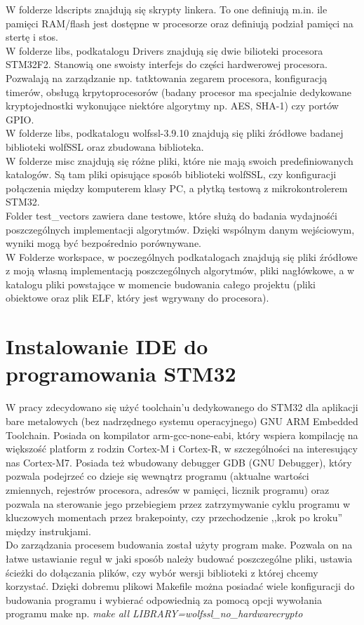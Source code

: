 \documentclass[oneside]{mgr}
\begin{document}
W folderze ldscripts znajdują się skrypty linkera. To one definiują m.in. ile pamięci RAM/flash jest dostępne w procesorze oraz definiują podział pamięci na stertę i stos.\\
W folderze libs, podkatalogu Drivers znajdują się dwie bilioteki procesora STM32F2. Stanowią one swoisty interfejs do części hardwerowej procesora. Pozwalają na zarządzanie np. tatktowania zegarem procesora, konfiguracją timerów, obsługą krpytoprocesorów (badany procesor ma specjalnie dedykowane kryptojednostki wykonujące niektóre algorytmy np. AES, SHA-1) czy portów GPIO.\\
W folderze libs, podkatalogu wolfssl-3.9.10 znajdują się pliki źródłowe badanej biblioteki wolfSSL oraz zbudowana biblioteka.\\
W folderze misc znajdują się różne pliki, które nie mają swoich predefiniowanych katalogów. Są tam pliki opisujące sposób biblioteki wolfSSL, czy konfiguracji połączenia między komputerem klasy PC, a płytką testową z mikrokontrolerem STM32.\\
Folder test\_vectors zawiera dane testowe, które służą do badania wydajnośći poszczególnych implementacji algorytmów. Dzięki wspólnym danym wejściowym, wyniki mogą być bezpośrednio porównywane.\\
W Folderze workspace, w poczególnych podkatalogach znajdują się pliki źródłowe z moją własną implementacją poszczególnych algorytmów, pliki nagłówkowe, a w katalogu pliki powstające w momencie budowania całego projektu (pliki obiektowe oraz plik ELF, który jest wgrywany do procesora).
\section{Instalowanie IDE do programowania STM32}

W pracy zdecydowano się użyć toolchain'u dedykowanego do STM32 dla aplikacji bare metalowych (bez nadrzędnego systemu operacyjnego) GNU ARM Embedded Toolchain. Posiada on kompilator arm-gcc-none-eabi, który wspiera kompilację na większość platform z rodzin Cortex-M i Cortex-R, w szczególności na interesujący nas Cortex-M7. Posiada też wbudowany debugger GDB (GNU Debugger), który pozwala podejrzeć co dzieje się wewnątrz programu (aktualne wartości zmiennych, rejestrów procesora, adresów w pamięci, licznik programu) oraz pozwala na sterowanie jego przebiegiem przez zatrzymywanie cyklu programu w kluczowych momentach przez brakepointy, czy przechodzenie ,,krok po kroku'' między instrukjami.\\
Do zarządzania procesem budowania został użyty program make. Pozwala on na łatwe ustawianie reguł w jaki sposób należy budować poszczególne pliki, ustawia ścieżki do dołączania plików, czy wybór wersji biblioteki z której chcemy korzystać. Dzięki dobremu plikowi Makefile można posiadać wiele konfiguracji do budowania programu i wybierać odpowiednią za pomocą opcji wywołania programu make np. \textit{make all LIBRARY=wolfssl\_no\_hardwarecrypto }
\end{document}
